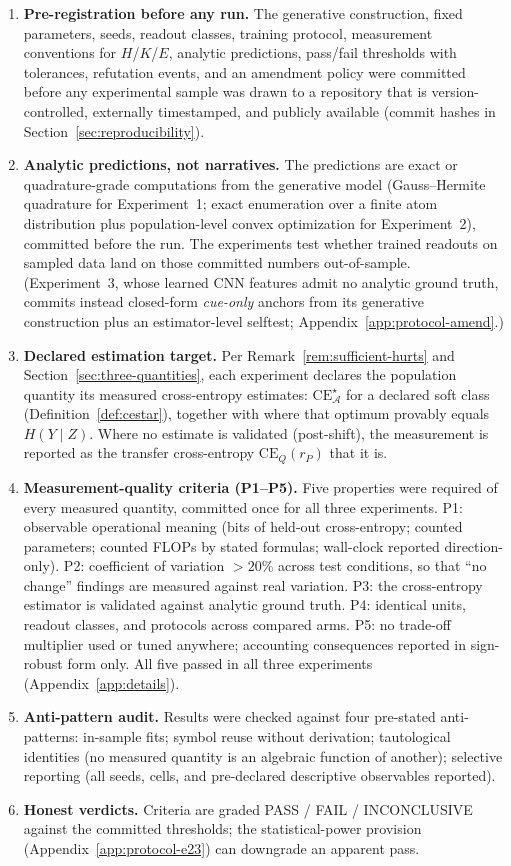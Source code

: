 \documentclass[twocolumn,10pt]{article}
\theoremstyle{definition}
\theoremstyle{remark}
\newcommand{\cA}{\mathcal{A}}
\newcommand{\CE}{\mathrm{CE}}
\newcommand{\CEQ}[1]{\CE_{Q}({#1})}
\newcommand{\rP}{r_{P}}
\begin{document}
\begin{enumerate}
\item \textbf{Pre-registration before any run.} The generative
construction, fixed parameters, seeds, readout classes, training
protocol, measurement conventions for $H$/$K$/$E$, analytic
predictions, pass/fail thresholds with tolerances, refutation events,
and an amendment policy were committed before any
experimental sample was drawn to a repository that is
version-controlled, externally timestamped, and publicly available
(commit hashes in
Section~\ref{sec:reproducibility}).
\item \textbf{Analytic predictions, not narratives.} The predictions
are exact or quadrature-grade computations from the generative model
(Gauss--Hermite quadrature for Experiment~1; exact enumeration over
a finite atom distribution plus population-level convex optimization
for Experiment~2), committed before the run. The experiments test
whether trained readouts on sampled data land on those committed
numbers out-of-sample. (Experiment~3, whose learned CNN features admit
no analytic ground truth, commits instead closed-form \emph{cue-only}
anchors from its generative construction plus an estimator-level
selftest; Appendix~\ref{app:protocol-amend}.)
\item \textbf{Declared estimation target.} Per
Remark~\ref{rem:sufficient-hurts} and
Section~\ref{sec:three-quantities}, each experiment declares the
population quantity its measured cross-entropy estimates:
$\CE^{\star}_{\cA}$ for a declared soft class
(Definition~\ref{def:cestar}), together with where that optimum
provably equals $H(Y \mid Z)$. Where no estimate is validated
(post-shift), the measurement is reported as the transfer
cross-entropy $\CEQ{\rP}$ that it is.
\item \textbf{Measurement-quality criteria (P1--P5).} Five properties
were required of every measured quantity, committed once for all three
experiments. P1: observable operational meaning (bits of held-out
cross-entropy; counted parameters; counted FLOPs by stated formulas;
wall-clock reported direction-only). P2: coefficient of variation
$> 20\%$ across test conditions, so that ``no change'' findings are
measured against real variation. P3: the cross-entropy estimator is
validated against analytic ground truth. P4: identical units, readout
classes, and protocols across compared arms. P5: no trade-off
multiplier used or tuned anywhere; accounting consequences reported in
sign-robust form only. All five passed in all three experiments
(Appendix~\ref{app:details}).
\item \textbf{Anti-pattern audit.} Results were checked against four
pre-stated anti-patterns: in-sample fits; symbol reuse without
derivation; tautological identities (no measured quantity is an
algebraic function of another); selective reporting (all seeds, cells,
and pre-declared descriptive observables reported).
\item \textbf{Honest verdicts.} Criteria are graded PASS / FAIL /
INCONCLUSIVE against the committed thresholds; the statistical-power
provision (Appendix~\ref{app:protocol-e23}) can downgrade an apparent
pass.
\end{enumerate}
\end{document}
